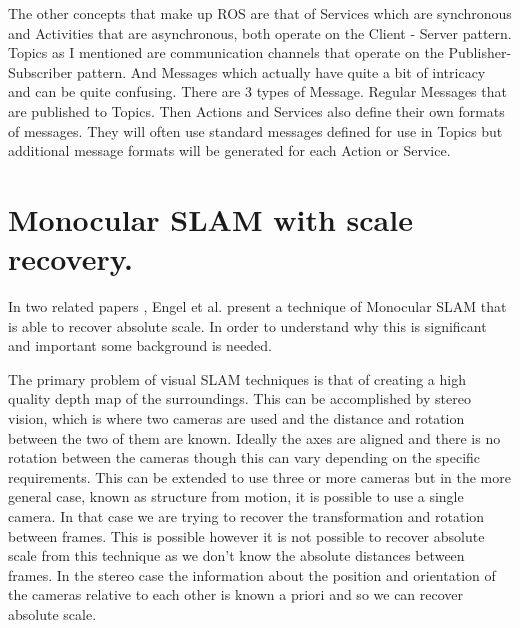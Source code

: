 \documentclass[]{../resources/final_report}
\begin{document}
The other concepts that make up ROS are that of Services which are synchronous and Activities that 
are asynchronous, both operate on the Client - Server pattern. Topics as I mentioned are 
communication channels that operate on the Publisher-Subscriber pattern. And Messages which actually 
have quite a bit of intricacy and can be quite confusing. There are 3 types of Message. Regular 
Messages that are published to Topics. Then Actions and Services also define their own formats of 
messages. They will often use standard messages defined for use in Topics but additional message 
formats will be generated for each Action or Service.

\section{Monocular SLAM with scale recovery.}

In two related papers \cite{Engel:FigureFlying}\cite{Engel:Camera-basedNav}, Engel et al. present a 
technique of Monocular SLAM that is able to recover absolute scale. In order to understand why 
this is significant and important some background is needed.

The primary problem of visual SLAM techniques is that of creating a high quality depth map of the 
surroundings. This can be accomplished by stereo vision, which is where two cameras are used and the 
distance and rotation between the two of them are known. Ideally the axes are aligned and there is 
no rotation between the cameras though this can vary depending on the specific requirements.
This can be extended to use three or more cameras but in the more general case, known as structure 
from motion, it is possible to use a single camera. In that case we are trying to recover the 
transformation and rotation between frames. This is possible however it is not possible to recover 
absolute scale from this technique as we don't know the absolute distances between frames. In the 
stereo case the information about the position and orientation of the cameras relative to each other
is known a priori and so we can recover absolute scale.
\end{document}
